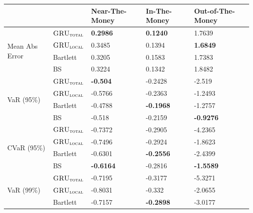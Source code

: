 \documentclass[letterpaper,12pt,titlepage,oneside,final]{book}
\numberwithin{equation}{section}
\theoremstyle{definition}
\newcommand{\modelT}{\textsc{GRU}_{\textsc{total}}}
\newcommand{\modelL}{\textsc{GRU}_{\textsc{local}}}
\begin{document}
\begin{table}[htp!]
	\centering
	\begin{tabular}{ll|l|l|l|}
		\cline{3-5}
		&          & Near-The-Money   & In-The-Money     & Out-of-The-Money  \\ \hline
		\multicolumn{1}{|l|}{\multirow{4}{*}{Mean Abs Error}} & $\modelT$    & \textbf{0.2986}  & \textbf{0.1240}  & 1.7639            \\  
		\multicolumn{1}{|l|}{}                                & $\modelL$    & 0.3485           & 0.1394           & \textbf{1.6849}   \\  
		\multicolumn{1}{|l|}{}                                & Bartlett & 0.3205           & 0.1583           & 1.7383            \\  
		\multicolumn{1}{|l|}{}                                & BS       & 0.3224           & 0.1342           & 1.8482            \\ 
		\hline
		\multicolumn{1}{|l|}{\multirow{4}{*}{VaR (95\%)}}     & $\modelT$    &\textbf{-0.504}  &-0.2428 &-2.519           \\  
		\multicolumn{1}{|l|}{}                                & $\modelL$    &-0.5766 &-0.2363 &-1.2493  \\  
		\multicolumn{1}{|l|}{}                                & Bartlett 	 &-0.4788 &\textbf{-0.1968} &-1.2757           \\  
		\multicolumn{1}{|l|}{}                                & BS       	 &-0.518  &-0.2159 &\textbf{-0.9276}           \\ 
		\hline
		\multicolumn{1}{|l|}{\multirow{4}{*}{CVaR (95\%)}}    & $\modelT$    &-0.7372 &-0.2905 &-4.2365 \\  
		\multicolumn{1}{|l|}{}                                & $\modelL$    &-0.7496 &-0.2924 &-1.8623          \\  
		\multicolumn{1}{|l|}{}                                & Bartlett 	 &-0.6301 &\textbf{-0.2556} &-2.4399          \\  
		\multicolumn{1}{|l|}{}                                & BS       	 &\textbf{-0.6164} &-0.2816 &\textbf{-1.5589}          \\ 
		\hline
		\multicolumn{1}{|l|}{\multirow{4}{*}{VaR (99\%)}}     & $\modelT$   &-0.7195 &-0.3177 &-5.3271         \\  
		\multicolumn{1}{|l|}{}                                & $\modelL$   &-0.8031 &-0.332  &-2.0655
		                  \\  
		\multicolumn{1}{|l|}{}                                & Bartlett 	& -0.7157 &\textbf{-0.2898} &-3.0177\\  

\end{tabular}
\end{table}
\end{document}
